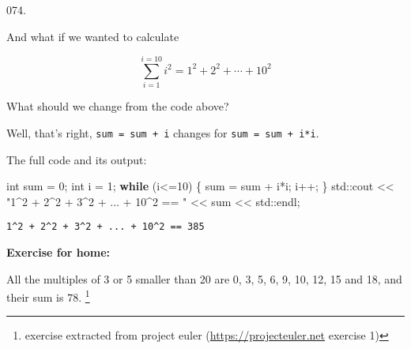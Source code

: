 \documentclass[]{book}
\newenvironment{Shaded}{}{}
\newcommand{\BuiltInTok}[1]{#1}
\newcommand{\ControlFlowTok}[1]{\textcolor[rgb]{0.00,0.44,0.13}{\textbf{#1}}}
\newcommand{\DataTypeTok}[1]{\textcolor[rgb]{0.56,0.13,0.00}{#1}}
\newcommand{\DecValTok}[1]{\textcolor[rgb]{0.25,0.63,0.44}{#1}}
\newcommand{\NormalTok}[1]{#1}
\newcommand{\StringTok}[1]{\textcolor[rgb]{0.25,0.44,0.63}{#1}}
\begin{document}
\vspace{2mm}\noindent\hrulefill{}

\begin{minipage}{\linewidth}\noindent
{\tiny 074.}\\
\begin{minipage}[t]{.485\linewidth}

And what if we wanted to calculate

\[\sum_{i=1}^{i=10}{i^2} = 1^2+2^2+ \cdots +10^2\]

What should we change from the code above?

\end{minipage}
\hfill
\begin{minipage}[t]{.485\linewidth}

Well, that's right, \texttt{sum\ =\ sum\ +\ i} changes for
\texttt{sum\ =\ sum\ +\ i*i}.

The full code and its output:

\begin{framed}

\begin{Shaded}
\begin{Highlighting}[]
\DataTypeTok{int}\NormalTok{ sum = }\DecValTok{0}\NormalTok{;}
\DataTypeTok{int}\NormalTok{ i = }\DecValTok{1}\NormalTok{;}
\ControlFlowTok{while}\NormalTok{ (i<=}\DecValTok{10}\NormalTok{) \{}
\NormalTok{  sum = sum + i*i;}
\NormalTok{  i++;}
\NormalTok{\}}
\BuiltInTok{std::}\NormalTok{cout << }\StringTok{"1^2 + 2^2 + 3^2 + ... + 10^2 == "}
\NormalTok{          << sum << }\BuiltInTok{std::}\NormalTok{endl;}
\end{Highlighting}
\end{Shaded}

\end{framed}

\begin{framed}

\begin{verbatim}
1^2 + 2^2 + 3^2 + ... + 10^2 == 385
\end{verbatim}

\end{framed}

\end{minipage}
\end{minipage}

\vspace{2mm}\noindent\hrulefill{}

\textbf{Exercise for home:}

All the multiples of 3 or 5 smaller than 20 are 0, 3, 5, 6, 9, 10, 12,
15 and 18, and their sum is \(78\). \footnote{exercise extracted from
  project euler (\url{https://projecteuler.net} exercise 1)}
\end{document}
